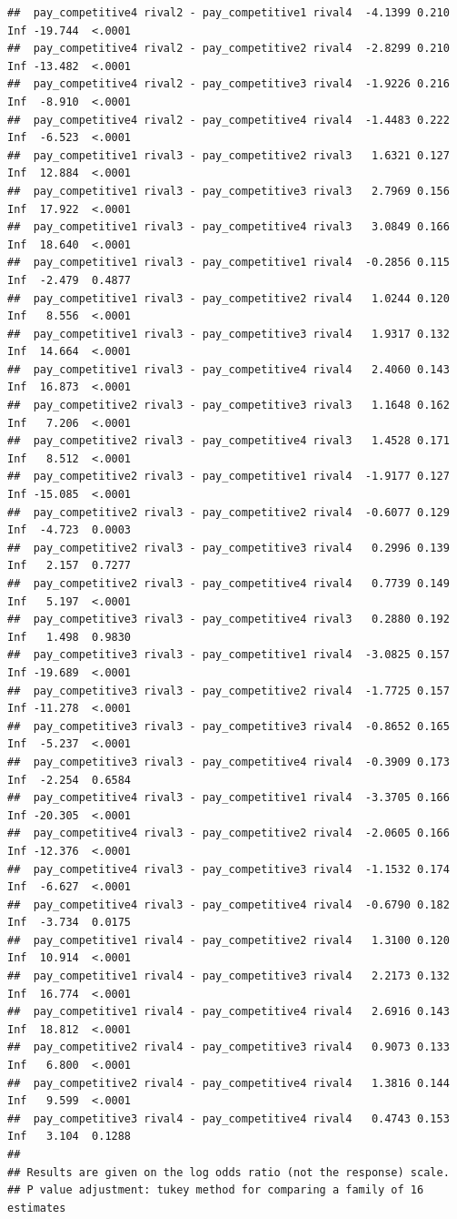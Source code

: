 \documentclass[
]{article}
\begin{document}
\begin{verbatim}
##  pay_competitive4 rival2 - pay_competitive1 rival4  -4.1399 0.210 Inf -19.744  <.0001
##  pay_competitive4 rival2 - pay_competitive2 rival4  -2.8299 0.210 Inf -13.482  <.0001
##  pay_competitive4 rival2 - pay_competitive3 rival4  -1.9226 0.216 Inf  -8.910  <.0001
##  pay_competitive4 rival2 - pay_competitive4 rival4  -1.4483 0.222 Inf  -6.523  <.0001
##  pay_competitive1 rival3 - pay_competitive2 rival3   1.6321 0.127 Inf  12.884  <.0001
##  pay_competitive1 rival3 - pay_competitive3 rival3   2.7969 0.156 Inf  17.922  <.0001
##  pay_competitive1 rival3 - pay_competitive4 rival3   3.0849 0.166 Inf  18.640  <.0001
##  pay_competitive1 rival3 - pay_competitive1 rival4  -0.2856 0.115 Inf  -2.479  0.4877
##  pay_competitive1 rival3 - pay_competitive2 rival4   1.0244 0.120 Inf   8.556  <.0001
##  pay_competitive1 rival3 - pay_competitive3 rival4   1.9317 0.132 Inf  14.664  <.0001
##  pay_competitive1 rival3 - pay_competitive4 rival4   2.4060 0.143 Inf  16.873  <.0001
##  pay_competitive2 rival3 - pay_competitive3 rival3   1.1648 0.162 Inf   7.206  <.0001
##  pay_competitive2 rival3 - pay_competitive4 rival3   1.4528 0.171 Inf   8.512  <.0001
##  pay_competitive2 rival3 - pay_competitive1 rival4  -1.9177 0.127 Inf -15.085  <.0001
##  pay_competitive2 rival3 - pay_competitive2 rival4  -0.6077 0.129 Inf  -4.723  0.0003
##  pay_competitive2 rival3 - pay_competitive3 rival4   0.2996 0.139 Inf   2.157  0.7277
##  pay_competitive2 rival3 - pay_competitive4 rival4   0.7739 0.149 Inf   5.197  <.0001
##  pay_competitive3 rival3 - pay_competitive4 rival3   0.2880 0.192 Inf   1.498  0.9830
##  pay_competitive3 rival3 - pay_competitive1 rival4  -3.0825 0.157 Inf -19.689  <.0001
##  pay_competitive3 rival3 - pay_competitive2 rival4  -1.7725 0.157 Inf -11.278  <.0001
##  pay_competitive3 rival3 - pay_competitive3 rival4  -0.8652 0.165 Inf  -5.237  <.0001
##  pay_competitive3 rival3 - pay_competitive4 rival4  -0.3909 0.173 Inf  -2.254  0.6584
##  pay_competitive4 rival3 - pay_competitive1 rival4  -3.3705 0.166 Inf -20.305  <.0001
##  pay_competitive4 rival3 - pay_competitive2 rival4  -2.0605 0.166 Inf -12.376  <.0001
##  pay_competitive4 rival3 - pay_competitive3 rival4  -1.1532 0.174 Inf  -6.627  <.0001
##  pay_competitive4 rival3 - pay_competitive4 rival4  -0.6790 0.182 Inf  -3.734  0.0175
##  pay_competitive1 rival4 - pay_competitive2 rival4   1.3100 0.120 Inf  10.914  <.0001
##  pay_competitive1 rival4 - pay_competitive3 rival4   2.2173 0.132 Inf  16.774  <.0001
##  pay_competitive1 rival4 - pay_competitive4 rival4   2.6916 0.143 Inf  18.812  <.0001
##  pay_competitive2 rival4 - pay_competitive3 rival4   0.9073 0.133 Inf   6.800  <.0001
##  pay_competitive2 rival4 - pay_competitive4 rival4   1.3816 0.144 Inf   9.599  <.0001
##  pay_competitive3 rival4 - pay_competitive4 rival4   0.4743 0.153 Inf   3.104  0.1288
## 
## Results are given on the log odds ratio (not the response) scale. 
## P value adjustment: tukey method for comparing a family of 16 estimates
\end{verbatim}
\end{document}
